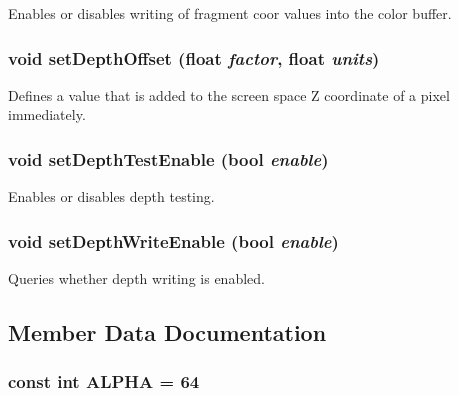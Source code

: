 Enables or disables writing of fragment coor values into the color buffer. \hypertarget{classm3g_1_1CompositingMode_4c825055ad0b5910ef4f9136d9a8e588}{
\subsubsection[{setDepthOffset}]{\setlength{\rightskip}{0pt plus 5cm}void setDepthOffset (float {\em factor}, \/  float {\em units})}}
\label{classm3g_1_1CompositingMode_4c825055ad0b5910ef4f9136d9a8e588}


Defines a value that is added to the screen space Z coordinate of a pixel immediately. \hypertarget{classm3g_1_1CompositingMode_5f1afccdc51665bb04c971579d8ee05c}{
\subsubsection[{setDepthTestEnable}]{\setlength{\rightskip}{0pt plus 5cm}void setDepthTestEnable (bool {\em enable})}}
\label{classm3g_1_1CompositingMode_5f1afccdc51665bb04c971579d8ee05c}


Enables or disables depth testing. \hypertarget{classm3g_1_1CompositingMode_a3275c9589ef319c6ba6f5c22d0b2860}{
\subsubsection[{setDepthWriteEnable}]{\setlength{\rightskip}{0pt plus 5cm}void setDepthWriteEnable (bool {\em enable})}}
\label{classm3g_1_1CompositingMode_a3275c9589ef319c6ba6f5c22d0b2860}


Queries whether depth writing is enabled. 

\subsection{Member Data Documentation}
\hypertarget{classm3g_1_1CompositingMode_417581fcde4067111f47320edb2aa378}{
\subsubsection[{ALPHA}]{\setlength{\rightskip}{0pt plus 5cm}const int {\bf ALPHA} = 64}}
\label{classm3g_1_1CompositingMode_417581fcde4067111f47320edb2aa378}


